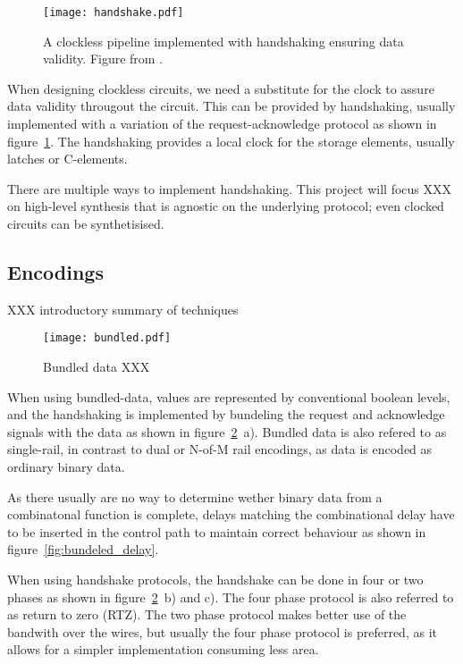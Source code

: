 \begin{figure}[htbp]
  \centering
  \texttt{[image: handshake.pdf]}
  \caption{A clockless pipeline implemented with handshaking ensuring
    data validity. Figure from \cite{sparso}.}
  \label{fig:handshake}
\end{figure}

When designing clockless circuits, we need a substitute for the clock
to assure data validity througout the circuit. This can be provided by
handshaking, usually implemented with a variation of the
request-acknowledge protocol as shown in
figure~\ref{fig:handshake}. The handshaking provides a local clock for
the storage elements, usually latches or C-elements.

There are multiple ways to implement handshaking. This project will
focus XXX on high-level synthesis that is agnostic on the underlying
protocol; even clocked circuits can be synthetisised. 

\subsection{Encodings}

XXX introductory summary of techniques

\begin{figure}[htbp]
  \centering
  \texttt{[image: bundled.pdf]}
  \caption{Bundled data XXX}
  \label{fig:bundled}
\end{figure}

When using bundled-data, values are represented by conventional
boolean levels, and the handshaking is implemented by bundeling the
request and acknowledge signals with the data as shown in
figure~\ref{fig:bundled}~a). Bundled data is also refered to as
single-rail, in contrast to dual or N-of-M rail encodings, as data is
encoded as ordinary binary data.

As there usually are no way to determine wether binary data from a
combinatonal function is complete, delays matching the combinational
delay have to be inserted in the control path to maintain correct
behaviour as shown in figure~\ref{fig:bundeled_delay}.

When using handshake protocols, the handshake can be done in four or
two phases as shown in figure~\ref{fig:bundled}~b) and c). The four
phase protocol is also referred to as return to zero (RTZ). The two
phase protocol makes better use of the bandwith over the wires, but
usually the four phase protocol is preferred, as it allows for a
simpler implementation consuming less area.

